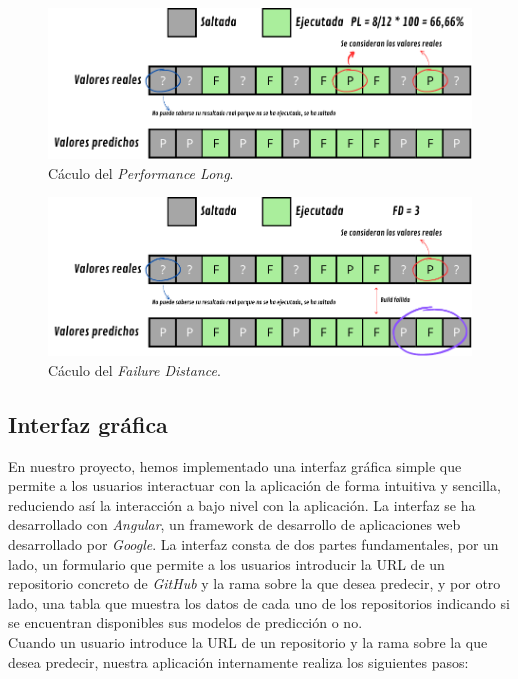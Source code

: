 \begin{figure}[H]
    \centering
    \includegraphics[scale=0.8]{images/PL.pdf}
    \caption{Cáculo del \textit{Performance Long}.}
    \label{fig:PL}
\end{figure}

\begin{figure}[H]
    \centering
    \includegraphics[scale=0.8]{images/FD.pdf}
    \caption{Cáculo del \textit{Failure Distance}.}
    \label{fig:FD}
\end{figure}

\subsection{Interfaz gráfica}
En nuestro proyecto, hemos implementado una interfaz gráfica simple que permite a los usuarios
interactuar con la aplicación de forma intuitiva y sencilla, reduciendo así la interacción a
bajo nivel con la aplicación. La interfaz se ha desarrollado con \textit{Angular}, un framework
de desarrollo de aplicaciones web desarrollado por \textit{Google}. La interfaz consta de dos
partes fundamentales, por un lado, un formulario que permite a los usuarios introducir la URL
de un repositorio concreto de \textit{GitHub} y la rama sobre la que desea predecir, y por otro
lado, una tabla que muestra los datos de cada uno de los repositorios indicando si se encuentran
disponibles sus modelos de predicción o no. \\

Cuando un usuario introduce la URL de un repositorio y la rama sobre la que desea predecir,
nuestra aplicación internamente realiza los siguientes pasos:

